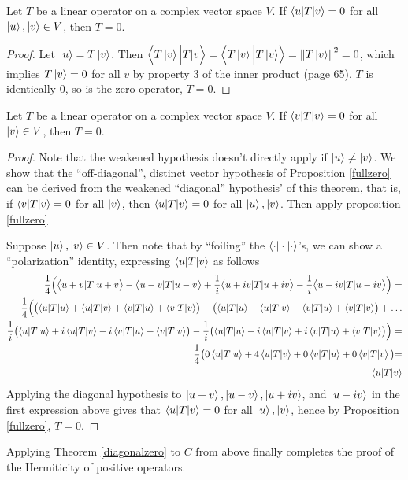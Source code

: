\begin{prop} \label{fullzero}
	Let $T$ be a linear operator on a complex vector space $V$. If $\braket{u | T | v } = 0$ for all $\ket{u}, \ket{v} \in V$, then $T = 0$.
\end{prop}
\begin{proof}
	Let $\ket{u} = T\ket{v}$. Then $\Bigl\langle T\ket{v} \Big\vert T | v \Bigr\rangle = \Bigl\langle T\ket{v} \Big\vert  T\ket{v} \Bigr\rangle = \left\lVert T\ket{v}\right\rVert^2 = 0$, which implies $T\ket{v} = 0$ for all $v$ by property 3 of the inner product (page 65).  $T$ is identically 0, so is the zero operator,  $T = 0$.
\end{proof}
\begin{thm}\label{diagonalzero}
	Let $T$ be a linear operator on a complex vector space $V$. If $\braket{v | T | v } = 0$ for all $\ket{v} \in V$, then $T = 0$.
\end{thm}
\begin{proof}
Note that the weakened hypothesis doesn't directly apply if $\ket{u} \neq \ket{v}$.  We show that the ``off-diagonal'', distinct vector hypothesis of Proposition \ref{fullzero} can be derived from the weakened ``diagonal'' hypothesis' of this theorem, that is, if $\braket{v | T | v } = 0$ for all $\ket{v}$, then $\braket{u | T | v } = 0$ for all $\ket{u},\ket{v}$. Then apply proposition \ref{fullzero}

Suppose $\ket{u}, \ket{v} \in V$. Then note that by ``foiling'' the $\braket{\cdot|\cdot|\cdot}$'s, we can show a ``polarization'' identity, expressing $\braket{u|T|v}$ as follows
	\begin{align*}
		\frac{1}{4} \Bigl( \bigl\langle u+v|T|u+v\bigr\rangle - \bigl\langle u-v|T|u-v\bigr\rangle + \frac{1}{i}\bigl\langle u+iv|T|u+iv\bigr\rangle -\frac{1}{i} \bigl\langle u-iv|T|u-iv\bigr\rangle \Bigr) = \\
		\frac{1}{4}\Bigl( \bigl(\braket{u|T|u} + \braket{u|T|v} + \braket{v|T|u} + \braket{v|T|v}\bigr) - \bigl(\braket{u|T|u} - \braket{u|T|v} - \braket{v|T|u} + \braket{v|T|v}\bigr) + \dots \\
		  \frac{1}{i}\bigl(\braket{u|T|u}+ i\braket{u|T|v}- i\braket{v|T|u}+ \braket{v|T|v}\bigr) -  \frac{1}{i}\bigl(\braket{u|T|u}- i\braket{u|T|v}+ i\braket{v|T|u} + \braket{v|T|v}\bigr)\Bigr) = \\
		\frac{1}{4}\bigr(0\braket{u|T|u} + 4\braket{u|T|v} + 0 \braket{v|T|u} + 0\braket{v|T|v}\bigl) = \\
		\braket{u|T|v} 
	\end{align*}
	Applying the diagonal hypothesis to $\ket{u+v}, \ket{u-v}, \ket{u+iv}$, and $\ket{u-iv}$ in the first expression above gives that $\braket{u|T|v} = 0$ for all $\ket{u},\ket{v}$, hence by Proposition \ref{fullzero}, $T = 0$.
\end{proof}
Applying Theorem \ref{diagonalzero} to $C$ from above finally completes the proof of the Hermiticity of positive operators.


